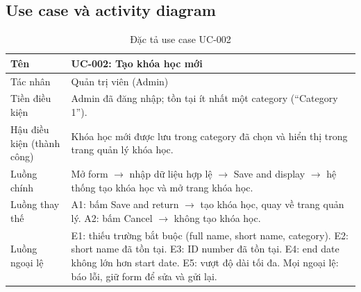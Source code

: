 \subsection{Use case và activity diagram}
\begin{table}[H]
\centering\small
\begin{tabular}{|L{3.6cm}|L{11.4cm}|}
\hline
Tên & UC-002: Tạo khóa học mới \\ \hline
Tác nhân & Quản trị viên (Admin) \\ \hline
Tiền điều kiện & Admin đã đăng nhập; tồn tại ít nhất một category (``Category 1''). \\ \hline
Hậu điều kiện (thành công) & Khóa học mới được lưu trong category đã chọn và hiển thị trong trang quản lý khóa học. \\ \hline
Luồng chính & Mở form $\rightarrow$ nhập dữ liệu hợp lệ $\rightarrow$ Save and display $\rightarrow$ hệ thống tạo khóa học và mở trang khóa học. \\ \hline
Luồng thay thế & A1: bấm Save and return $\rightarrow$ tạo khóa học, quay về trang quản lý. A2: bấm Cancel $\rightarrow$ không tạo khóa học. \\ \hline
Luồng ngoại lệ & E1: thiếu trường bắt buộc (full name, short name, category). E2: short name đã tồn tại. E3: ID number đã tồn tại.
E4: end date không lớn hơn start date. E5: vượt độ dài tối đa. Mọi ngoại lệ: báo lỗi, giữ form để sửa và gửi lại. \\ \hline
\end{tabular}
\caption{Đặc tả use case UC-002}
\end{table}

